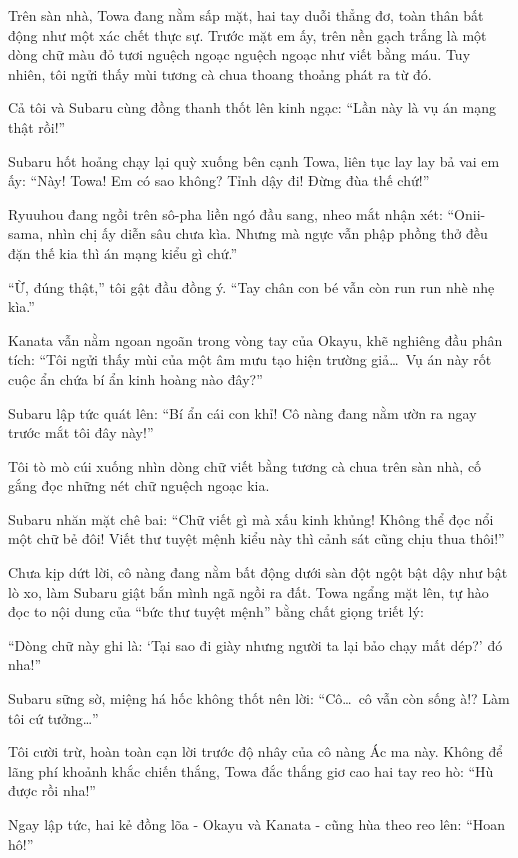 \documentclass[../main.tex]{subfiles}
\begin{document}
Trên sàn nhà, Towa đang nằm sấp mặt, hai tay duỗi thẳng đơ, toàn thân bất động như một xác chết thực sự. Trước mặt em ấy, trên nền gạch trắng là một dòng chữ màu đỏ tươi nguệch ngoạc nguệch ngoạc như viết bằng máu. Tuy nhiên, tôi ngửi thấy mùi tương cà chua thoang thoảng phát ra từ đó.


Cả tôi và Subaru cùng đồng thanh thốt lên kinh ngạc: ``Lần này là vụ án mạng thật rồi!''

Subaru hốt hoảng chạy lại quỳ xuống bên cạnh Towa, liên tục lay lay bả vai em ấy: ``Này! Towa! Em có sao không? Tỉnh dậy đi! Đừng đùa thế chứ!''

Ryuuhou đang ngồi trên sô-pha liền ngó đầu sang, nheo mắt nhận xét: ``Onii-sama, nhìn chị ấy diễn sâu chưa kìa. Nhưng mà ngực vẫn phập phồng thở đều đặn thế kia thì án mạng kiểu gì chứ.''

``Ừ, đúng thật,'' tôi gật đầu đồng ý. ``Tay chân con bé vẫn còn run run nhè nhẹ kìa.''

Kanata vẫn nằm ngoan ngoãn trong vòng tay của Okayu, khẽ nghiêng đầu phân tích: ``Tôi ngửi thấy mùi của một âm mưu tạo hiện trường giả\dots\ Vụ án này rốt cuộc ẩn chứa bí ẩn kinh hoàng nào đây?''

Subaru lập tức quát lên: ``Bí ẩn cái con khỉ! Cô nàng đang nằm ườn ra ngay trước mắt tôi đây này!''

Tôi tò mò cúi xuống nhìn dòng chữ viết bằng tương cà chua trên sàn nhà, cố gắng đọc những nét chữ nguệch ngoạc kia.

Subaru nhăn mặt chê bai: ``Chữ viết gì mà xấu kinh khủng! Không thể đọc nổi một chữ bẻ đôi! Viết thư tuyệt mệnh kiểu này thì cảnh sát cũng chịu thua thôi!''

Chưa kịp dứt lời, cô nàng đang nằm bất động dưới sàn đột ngột bật dậy như bật lò xo, làm Subaru giật bắn mình ngã ngồi ra đất. Towa ngẩng mặt lên, tự hào đọc to nội dung của ``bức thư tuyệt mệnh'' bằng chất giọng triết lý:

``Dòng chữ này ghi là: `Tại sao đi giày nhưng người ta lại bảo chạy mất dép?' đó nha!''

Subaru sững sờ, miệng há hốc không thốt nên lời: ``Cô\dots\ cô vẫn còn sống à!? Làm tôi cứ tưởng\dots''

Tôi cười trừ, hoàn toàn cạn lời trước độ nhây của cô nàng Ác ma này. Không để lãng phí khoảnh khắc chiến thắng, Towa đắc thắng giơ cao hai tay reo hò: ``Hù được rồi nha!''

Ngay lập tức, hai kẻ đồng lõa - Okayu và Kanata - cũng hùa theo reo lên: ``Hoan hô!''
\end{document}
